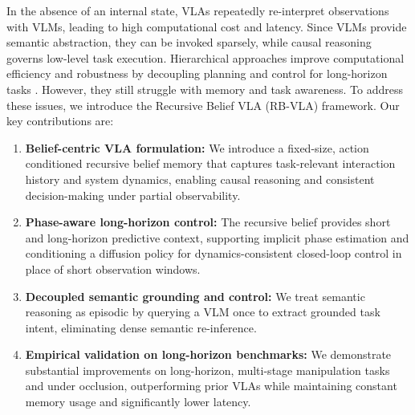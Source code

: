 \documentclass[conference]{IEEEtran}
\begin{document}
In the absence of an internal state, VLAs repeatedly re-interpret observations with VLMs, leading to high computational cost and latency. Since VLMs provide semantic abstraction, they can be invoked sparsely, while causal reasoning governs low-level task execution. Hierarchical approaches improve computational efficiency and robustness by decoupling planning and control for long-horizon tasks \cite{li2025towards,zhang2025hierarchical}. However, they still struggle with memory and task awareness.
To address these issues, we introduce the Recursive Belief VLA (RB-VLA) framework. Our key contributions are:
\newline
\begin{enumerate}
\item \textbf{Belief-centric VLA formulation:} We introduce a fixed-size, action conditioned recursive belief memory that captures task-relevant interaction history and system dynamics, enabling causal reasoning and consistent decision-making under partial observability.
\item \textbf{Phase-aware long-horizon control:} The recursive belief provides short and long-horizon predictive context, supporting implicit phase estimation and conditioning a diffusion policy for dynamics-consistent closed-loop control in place of short observation windows.
\item \textbf{Decoupled semantic grounding and control:} We treat semantic reasoning as episodic by querying a VLM once to extract grounded task intent, eliminating dense semantic re-inference. 
\item \textbf{Empirical validation on long-horizon benchmarks:} We demonstrate substantial improvements on long-horizon, multi-stage manipulation tasks and under occlusion, outperforming prior VLAs while maintaining constant memory usage and significantly lower latency.

\end{enumerate}
\end{document}
